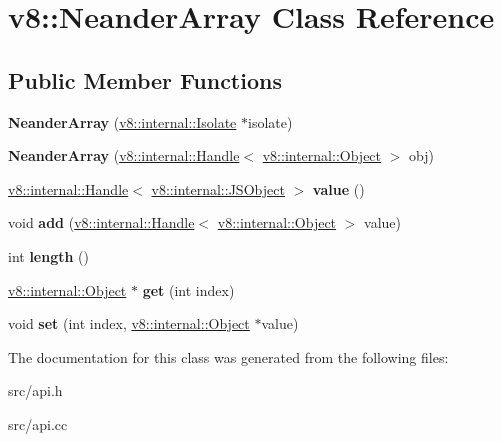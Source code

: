 \hypertarget{classv8_1_1_neander_array}{}\section{v8\+:\+:Neander\+Array Class Reference}
\label{classv8_1_1_neander_array}
\subsection*{Public Member Functions}
\begin{DoxyCompactItemize}
\item 
\hypertarget{classv8_1_1_neander_array_a605d5d05c8f06ff4d5bd0ace654f1a4a}{}{\bfseries Neander\+Array} (\hyperlink{classv8_1_1internal_1_1_isolate}{v8\+::internal\+::\+Isolate} $\ast$isolate)\label{classv8_1_1_neander_array_a605d5d05c8f06ff4d5bd0ace654f1a4a}

\item 
\hypertarget{classv8_1_1_neander_array_aa01b9315db85062067d067962f1d767f}{}{\bfseries Neander\+Array} (\hyperlink{classv8_1_1internal_1_1_handle}{v8\+::internal\+::\+Handle}$<$ \hyperlink{classv8_1_1internal_1_1_object}{v8\+::internal\+::\+Object} $>$ obj)\label{classv8_1_1_neander_array_aa01b9315db85062067d067962f1d767f}

\item 
\hypertarget{classv8_1_1_neander_array_ae370f4d476158c580f93397cdaf2ec55}{}\hyperlink{classv8_1_1internal_1_1_handle}{v8\+::internal\+::\+Handle}$<$ \hyperlink{classv8_1_1internal_1_1_j_s_object}{v8\+::internal\+::\+J\+S\+Object} $>$ {\bfseries value} ()\label{classv8_1_1_neander_array_ae370f4d476158c580f93397cdaf2ec55}

\item 
\hypertarget{classv8_1_1_neander_array_a1976064109c8e6be06043a5f3e045b92}{}void {\bfseries add} (\hyperlink{classv8_1_1internal_1_1_handle}{v8\+::internal\+::\+Handle}$<$ \hyperlink{classv8_1_1internal_1_1_object}{v8\+::internal\+::\+Object} $>$ value)\label{classv8_1_1_neander_array_a1976064109c8e6be06043a5f3e045b92}

\item 
\hypertarget{classv8_1_1_neander_array_a2421d6e75760b2323386c42744c460f6}{}int {\bfseries length} ()\label{classv8_1_1_neander_array_a2421d6e75760b2323386c42744c460f6}

\item 
\hypertarget{classv8_1_1_neander_array_ab867a17e683aee5fd1405a7463d13f69}{}\hyperlink{classv8_1_1internal_1_1_object}{v8\+::internal\+::\+Object} $\ast$ {\bfseries get} (int index)\label{classv8_1_1_neander_array_ab867a17e683aee5fd1405a7463d13f69}

\item 
\hypertarget{classv8_1_1_neander_array_a5fac39905786c26ae25ccf9d82c8f513}{}void {\bfseries set} (int index, \hyperlink{classv8_1_1internal_1_1_object}{v8\+::internal\+::\+Object} $\ast$value)\label{classv8_1_1_neander_array_a5fac39905786c26ae25ccf9d82c8f513}

\end{DoxyCompactItemize}


The documentation for this class was generated from the following files\+:\begin{DoxyCompactItemize}
\item 
src/api.\+h\item 
src/api.\+cc\end{DoxyCompactItemize}
